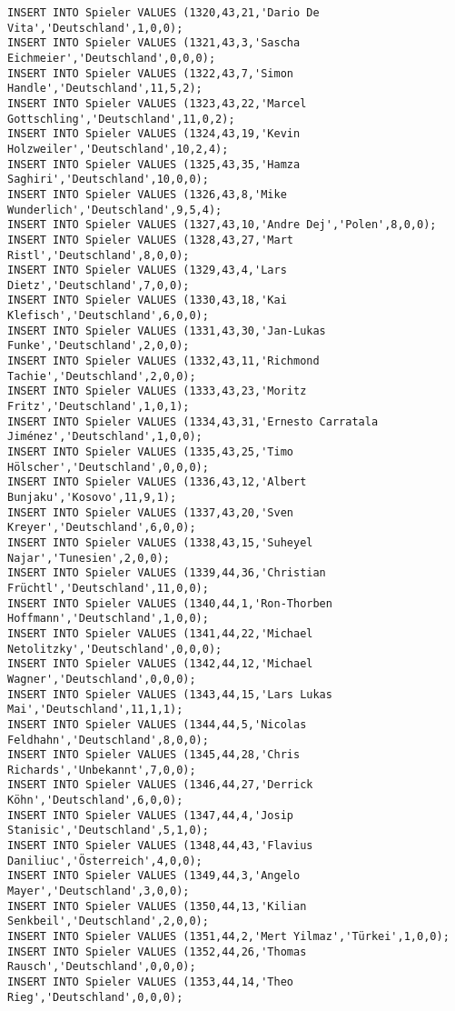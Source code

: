 \documentclass{lehramt-informatik-aufgabe}
\begin{document}
\begin{verbatim}
INSERT INTO Spieler VALUES (1320,43,21,'Dario De Vita','Deutschland',1,0,0);
INSERT INTO Spieler VALUES (1321,43,3,'Sascha Eichmeier','Deutschland',0,0,0);
INSERT INTO Spieler VALUES (1322,43,7,'Simon Handle','Deutschland',11,5,2);
INSERT INTO Spieler VALUES (1323,43,22,'Marcel Gottschling','Deutschland',11,0,2);
INSERT INTO Spieler VALUES (1324,43,19,'Kevin Holzweiler','Deutschland',10,2,4);
INSERT INTO Spieler VALUES (1325,43,35,'Hamza Saghiri','Deutschland',10,0,0);
INSERT INTO Spieler VALUES (1326,43,8,'Mike Wunderlich','Deutschland',9,5,4);
INSERT INTO Spieler VALUES (1327,43,10,'Andre Dej','Polen',8,0,0);
INSERT INTO Spieler VALUES (1328,43,27,'Mart Ristl','Deutschland',8,0,0);
INSERT INTO Spieler VALUES (1329,43,4,'Lars Dietz','Deutschland',7,0,0);
INSERT INTO Spieler VALUES (1330,43,18,'Kai Klefisch','Deutschland',6,0,0);
INSERT INTO Spieler VALUES (1331,43,30,'Jan-Lukas Funke','Deutschland',2,0,0);
INSERT INTO Spieler VALUES (1332,43,11,'Richmond Tachie','Deutschland',2,0,0);
INSERT INTO Spieler VALUES (1333,43,23,'Moritz Fritz','Deutschland',1,0,1);
INSERT INTO Spieler VALUES (1334,43,31,'Ernesto Carratala Jiménez','Deutschland',1,0,0);
INSERT INTO Spieler VALUES (1335,43,25,'Timo Hölscher','Deutschland',0,0,0);
INSERT INTO Spieler VALUES (1336,43,12,'Albert Bunjaku','Kosovo',11,9,1);
INSERT INTO Spieler VALUES (1337,43,20,'Sven Kreyer','Deutschland',6,0,0);
INSERT INTO Spieler VALUES (1338,43,15,'Suheyel Najar','Tunesien',2,0,0);
INSERT INTO Spieler VALUES (1339,44,36,'Christian Früchtl','Deutschland',11,0,0);
INSERT INTO Spieler VALUES (1340,44,1,'Ron-Thorben Hoffmann','Deutschland',1,0,0);
INSERT INTO Spieler VALUES (1341,44,22,'Michael Netolitzky','Deutschland',0,0,0);
INSERT INTO Spieler VALUES (1342,44,12,'Michael Wagner','Deutschland',0,0,0);
INSERT INTO Spieler VALUES (1343,44,15,'Lars Lukas Mai','Deutschland',11,1,1);
INSERT INTO Spieler VALUES (1344,44,5,'Nicolas Feldhahn','Deutschland',8,0,0);
INSERT INTO Spieler VALUES (1345,44,28,'Chris Richards','Unbekannt',7,0,0);
INSERT INTO Spieler VALUES (1346,44,27,'Derrick Köhn','Deutschland',6,0,0);
INSERT INTO Spieler VALUES (1347,44,4,'Josip Stanisic','Deutschland',5,1,0);
INSERT INTO Spieler VALUES (1348,44,43,'Flavius Daniliuc','Österreich',4,0,0);
INSERT INTO Spieler VALUES (1349,44,3,'Angelo Mayer','Deutschland',3,0,0);
INSERT INTO Spieler VALUES (1350,44,13,'Kilian Senkbeil','Deutschland',2,0,0);
INSERT INTO Spieler VALUES (1351,44,2,'Mert Yilmaz','Türkei',1,0,0);
INSERT INTO Spieler VALUES (1352,44,26,'Thomas Rausch','Deutschland',0,0,0);
INSERT INTO Spieler VALUES (1353,44,14,'Theo Rieg','Deutschland',0,0,0);

\end{verbatim}
\end{document}
